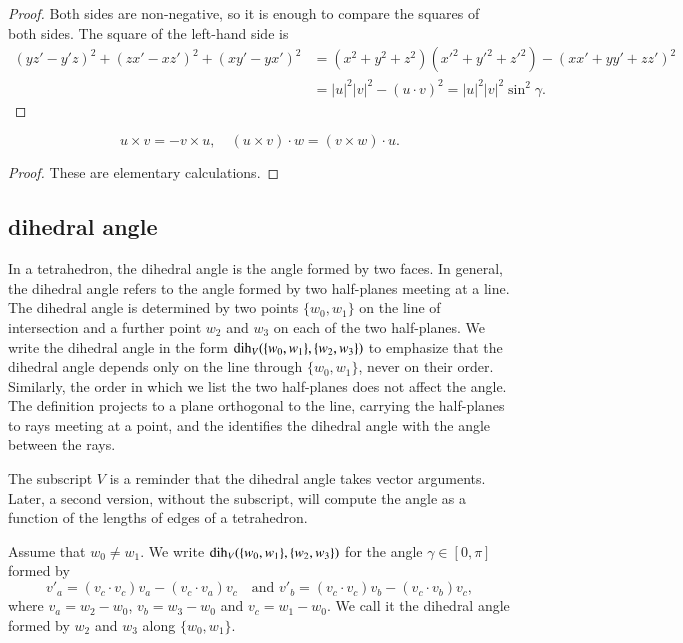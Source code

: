 \begin{proof}
   Both sides are non-negative, so it is enough to compare the
   squares of both sides.  The square of the left-hand side is
   $$
   \begin{array}{lll}
   (y z'- y'z)^2 + (z x' - x z')^2 + (x y' - y x')^2 &=
   (x^2 + y^2 + z^2)(x'^2 + y'^2 + z'^2) - (x x' + y y' + z z')^2
   \\&= |u|^2|v|^2 - (u\cdot v)^2 = |u|^2|v|^2 \sin^2\gamma.
   \end{array}
   $$
\end{proof}


\begin{lemma}
    $$
    u\times v = -v\times u,\quad
    (u\times v)\cdot w = (v\times w)\cdot u.
    $$
\end{lemma}

\begin{proof} These are elementary calculations.
\end{proof}



\subsection{dihedral angle}

In a tetrahedron, the dihedral angle is
the angle formed by two faces.  In general,
the dihedral angle refers to the angle formed by two half-planes
meeting at a line.  The dihedral angle is determined
by two points $\{w_0,w_1\}$ on the line of intersection
and a further point $w_2$ and $w_3$ on each of the two half-planes.
We write the dihedral angle in the form $\operatorname{dih}_V(\{w_0,w_1\},\{w_2,w_3\})$ to emphasize that the dihedral angle depends only
on the line through $\{w_0,w_1\}$, never on their order.
Similarly, the order in which we list 
the two half-planes does not affect
the angle.  The definition projects
to a plane orthogonal to the line, carrying
the half-planes to rays meeting at a point, and
the identifies the dihedral angle with the angle
between the rays.  

The subscript $V$ is a reminder 
that the dihedral angle takes vector arguments.
Later, a second version, without the subscript, will
compute the angle as a function of the lengths of edges of a 
tetrahedron.



\begin{definition}\label{def:dih} Assume that $w_0\ne w_1$.
We write $\operatorname{dih}_V(\{w_0,w_1\},\{w_2,w_3\})$ for the angle $\gamma\in[0,\pi]$
formed
by 
    $$
    v'_a = (v_c\cdot v_c) v_a - (v_c\cdot v_a) v_c\quad\text{and }v'_b =
            (v_c\cdot v_c) v_b - (v_c\cdot v_b) v_c,
    $$
where $v_a = w_2-w_0$, $v_b=w_3-w_0$ and $v_c=w_1-w_0$.  We call it
the dihedral angle formed by $w_2$ and $w_3$ along $\{w_0,w_1\}$.
\end{definition}

